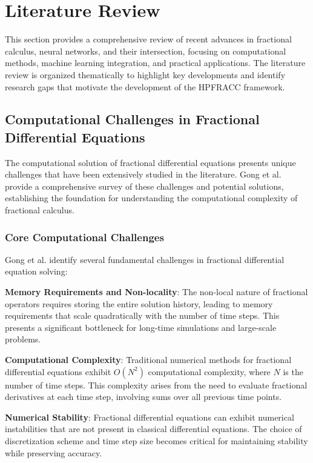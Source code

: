\section{Literature Review}

This section provides a comprehensive review of recent advances in fractional calculus, neural networks, and their intersection, focusing on computational methods, machine learning integration, and practical applications. The literature review is organized thematically to highlight key developments and identify research gaps that motivate the development of the HPFRACC framework.

\subsection{Computational Challenges in Fractional Differential Equations}

The computational solution of fractional differential equations presents unique challenges that have been extensively studied in the literature. Gong et al. \cite{Gong2015ComputationalChallengeFDE} provide a comprehensive survey of these challenges and potential solutions, establishing the foundation for understanding the computational complexity of fractional calculus.

\subsubsection{Core Computational Challenges}

Gong et al. identify several fundamental challenges in fractional differential equation solving:

\textbf{Memory Requirements and Non-locality}: The non-local nature of fractional operators requires storing the entire solution history, leading to memory requirements that scale quadratically with the number of time steps. This presents a significant bottleneck for long-time simulations and large-scale problems.

\textbf{Computational Complexity}: Traditional numerical methods for fractional differential equations exhibit $O(N^2)$ computational complexity, where $N$ is the number of time steps. This complexity arises from the need to evaluate fractional derivatives at each time step, involving sums over all previous time points.

\textbf{Numerical Stability}: Fractional differential equations can exhibit numerical instabilities that are not present in classical differential equations. The choice of discretization scheme and time step size becomes critical for maintaining stability while preserving accuracy.

